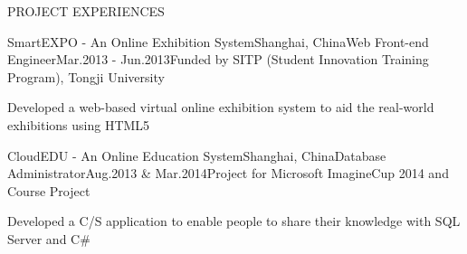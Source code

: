 \documentclass{resume} %
\begin{document}
\begin{rSection}{PROJECT EXPERIENCES}
  \begin{pSubsection}{SmartEXPO - An Online Exhibition System}{Shanghai,
    China}{Web Front-end Engineer}{Mar.2013 - Jun.2013}{Funded by SITP (Student Innovation Training Program), Tongji University}
  \item Developed a web-based virtual online exhibition system to aid the real-world exhibitions using HTML5
  \end{pSubsection}

  \begin{pSubsection}{CloudEDU - An Online Education System}{Shanghai,
  China}{Database Administrator}{Aug.2013 \& Mar.2014}{Project for Microsoft ImagineCup 2014 and Course Project}
  \item Developed a C/S application to enable people to share their knowledge with SQL Server and C\#
  \end{pSubsection}

\end{rSection}

\end{document}
